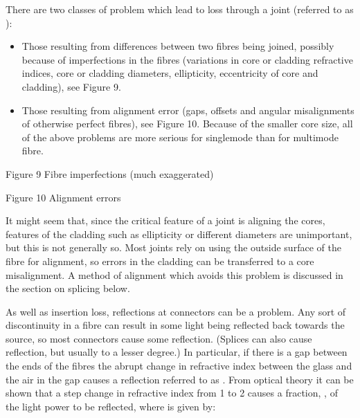 \documentclass[letterpaper,10pt,english]{sphinxmanual}
\let\sphinxpxdimen\pdfpxdimen\else\newdimen\sphinxpxdimen
\begin{document}
There are two classes of problem which lead to loss through a joint (referred to as ):
\begin{itemize}
\item {} 
Those resulting from differences between two fibres being joined, possibly because of imperfections in the fibres (variations in core or cladding refractive indices, core or cladding diameters, ellipticity, eccentricity of core and cladding), see Figure 9.

\item {} 
Those resulting from alignment error (gaps, offsets and angular misalignments of otherwise perfect fibres), see Figure 10. Because of the smaller core size, all of the above problems are more serious for single\sphinxhyphen{}mode than for multimode fibre.

\end{itemize}

\sphinxincludegraphics[width=511\sphinxpxdimen,height=1217\sphinxpxdimen]{{t305_009i}.jpg}

Figure 9 Fibre imperfections (much exaggerated)

\sphinxincludegraphics[width=511\sphinxpxdimen,height=502\sphinxpxdimen]{{t305_010i}.jpg}

Figure 10 Alignment errors

It might seem that, since the critical feature of a joint is aligning the cores, features of the cladding such as ellipticity or different diameters are unimportant, but this is not generally so. Most joints rely on using the outside surface of the fibre for alignment, so errors in the cladding can be transferred to a core misalignment. A method of alignment which avoids this problem is discussed in the section on splicing below.

As well as insertion loss, reflections at connectors can be a problem. Any sort of discontinuity in a fibre can result in some light being reflected back towards the source, so most connectors cause some reflection. (Splices can also cause reflection, but usually to a lesser degree.) In particular, if there is a gap between the ends of the fibres the abrupt change in refractive index between the glass and the air in the gap causes a reflection referred to as . From optical
theory it can be shown that a step change in refractive index from 1 to 2 causes a fraction, , of the light power to be reflected, where  is given by:
\end{document}
